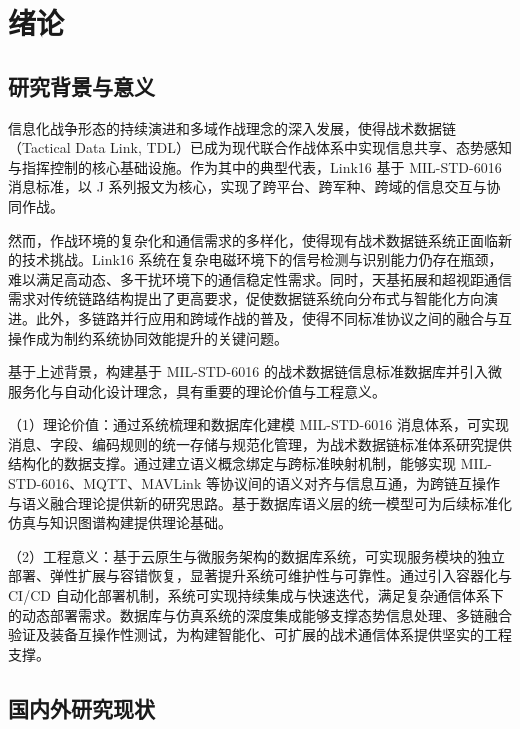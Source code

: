 \chapter{绪论}

\section{研究背景与意义}

信息化战争形态的持续演进和多域作战理念的深入发展，使得战术数据链（Tactical Data Link, TDL）已成为现代联合作战体系中实现信息共享、态势感知与指挥控制的核心基础设施\cite{NDIA_PMW101_2024,NDIA_PMW101_2022}。作为其中的典型代表，{Link16} 基于 MIL-STD-6016 消息标准，以 J 系列报文为核心，实现了跨平台、跨军种、跨域的信息交互与协同作战\cite{DOTE_2022_MIDS_LVT,NAVAIR_MIDS_Overview}。

然而，作战环境的复杂化和通信需求的多样化，使得现有战术数据链系统正面临新的技术挑战。{Link16} 系统在复杂电磁环境下的信号检测与识别能力仍存在瓶颈，难以满足高动态、多干扰环境下的通信稳定性需求\cite{AviationWeek_SDA_LEO_2024,SDA_testing_OK_2023}。同时，天基拓展和超视距通信需求对传统链路结构提出了更高要求，促使数据链系统向分布式与智能化方向演进\cite{MIL_STD_6016_Active_2024,L3Harris_MIDS_JTRS_2021}。此外，多链路并行应用和跨域作战的普及，使得不同标准协议之间的融合与互操作成为制约系统协同效能提升的关键问题。

基于上述背景，构建基于 MIL-STD-6016 的战术数据链信息标准数据库并引入微服务化与自动化设计理念，具有重要的理论价值与工程意义。

（1）理论价值：通过系统梳理和数据库化建模 MIL-STD-6016 消息体系，可实现消息、字段、编码规则的统一存储与规范化管理，为战术数据链标准体系研究提供结构化的数据支撑。通过建立语义概念绑定与跨标准映射机制，能够实现 MIL-STD-6016、MQTT、MAVLink 等协议间的语义对齐与信息互通，为跨链互操作与语义融合理论提供新的研究思路。基于数据库语义层的统一模型可为后续标准化仿真与知识图谱构建提供理论基础。

（2）工程意义：基于云原生与微服务架构的数据库系统，可实现服务模块的独立部署、弹性扩展与容错恢复，显著提升系统可维护性与可靠性。通过引入容器化与 CI/CD 自动化部署机制，系统可实现持续集成与快速迭代，满足复杂通信体系下的动态部署需求。数据库与仿真系统的深度集成能够支撑态势信息处理、多链融合验证及装备互操作性测试，为构建智能化、可扩展的战术通信体系提供坚实的工程支撑。

\section{国内外研究现状}

